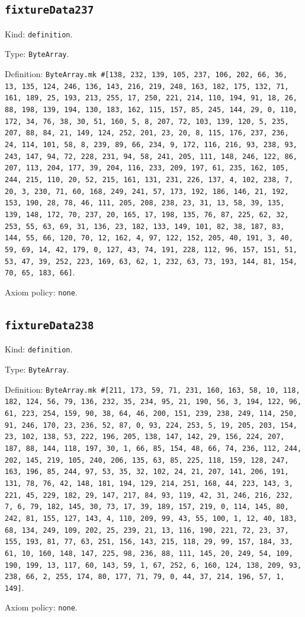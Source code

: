 \documentclass[11pt]{article}
\begin{document}
\subsection*{\texttt{fixtureData237}}
\noindent Kind: \texttt{definition}.\par
\noindent Type: \texttt{ByteArray}.\par
\noindent Definition: \texttt{ByteArray.mk \#[138, 232, 139, 105, 237, 106, 202, 66, 36, 13, 135, 124, 246, 136, 143, 216, 219, 248, 163, 182, 175, 132, 71, 161, 189, 25, 193, 213, 255, 17, 250, 221, 214, 110, 194, 91, 18, 26, 88, 198, 139, 194, 130, 183, 162, 115, 157, 85, 245, 144, 29, 0, 110, 172, 34, 76, 38, 30, 51, 160, 5, 8, 207, 72, 103, 139, 120, 5, 235, 207, 88, 84, 21, 149, 124, 252, 201, 23, 20, 8, 115, 176, 237, 236, 24, 114, 101, 58, 8, 239, 89, 66, 234, 9, 172, 116, 216, 93, 238, 93, 243, 147, 94, 72, 228, 231, 94, 58, 241, 205, 111, 148, 246, 122, 86, 207, 113, 204, 177, 39, 204, 116, 233, 209, 197, 61, 235, 162, 105, 244, 215, 110, 20, 52, 215, 161, 131, 231, 226, 137, 4, 102, 238, 7, 20, 3, 230, 71, 60, 168, 249, 241, 57, 173, 192, 186, 146, 21, 192, 153, 190, 28, 78, 46, 111, 205, 208, 238, 23, 31, 13, 58, 39, 135, 139, 148, 172, 70, 237, 20, 165, 17, 198, 135, 76, 87, 225, 62, 32, 253, 55, 63, 69, 31, 136, 23, 182, 133, 149, 101, 82, 38, 187, 83, 144, 55, 66, 120, 70, 12, 162, 4, 97, 122, 152, 205, 40, 191, 3, 40, 59, 69, 14, 42, 179, 0, 127, 43, 74, 191, 228, 112, 96, 157, 151, 51, 53, 47, 39, 252, 223, 169, 63, 62, 1, 232, 63, 73, 193, 144, 81, 154, 70, 65, 183, 66]}.\par
\noindent Axiom policy: \texttt{none}.\par
\subsection*{\texttt{fixtureData238}}
\noindent Kind: \texttt{definition}.\par
\noindent Type: \texttt{ByteArray}.\par
\noindent Definition: \texttt{ByteArray.mk \#[211, 173, 59, 71, 231, 160, 163, 58, 10, 118, 182, 124, 56, 79, 136, 232, 35, 234, 95, 21, 190, 56, 3, 194, 122, 96, 61, 223, 254, 159, 90, 38, 64, 46, 200, 151, 239, 238, 249, 114, 250, 91, 246, 170, 23, 236, 52, 87, 0, 93, 224, 253, 5, 19, 205, 203, 154, 23, 102, 138, 53, 222, 196, 205, 138, 147, 142, 29, 156, 224, 207, 187, 88, 144, 118, 197, 30, 1, 66, 85, 154, 48, 66, 74, 236, 112, 244, 202, 145, 219, 105, 240, 206, 135, 63, 85, 225, 118, 159, 128, 247, 163, 196, 85, 244, 97, 53, 35, 32, 102, 24, 21, 207, 141, 206, 191, 131, 78, 76, 42, 148, 181, 194, 129, 214, 251, 168, 44, 223, 143, 3, 221, 45, 229, 182, 29, 147, 217, 84, 93, 119, 42, 31, 246, 216, 232, 7, 6, 79, 182, 145, 30, 73, 17, 39, 189, 157, 219, 0, 114, 145, 80, 242, 81, 155, 127, 143, 4, 110, 209, 99, 43, 55, 100, 1, 12, 40, 183, 68, 134, 249, 109, 202, 25, 239, 21, 13, 116, 190, 221, 72, 23, 37, 155, 193, 81, 77, 63, 251, 156, 143, 215, 118, 29, 99, 157, 184, 33, 61, 10, 160, 148, 147, 225, 98, 236, 88, 111, 145, 20, 249, 54, 109, 190, 199, 13, 117, 60, 143, 59, 1, 67, 252, 6, 160, 124, 138, 209, 93, 238, 66, 2, 255, 174, 80, 177, 71, 79, 0, 44, 37, 214, 196, 57, 1, 149]}.\par
\noindent Axiom policy: \texttt{none}.\par
\end{document}
